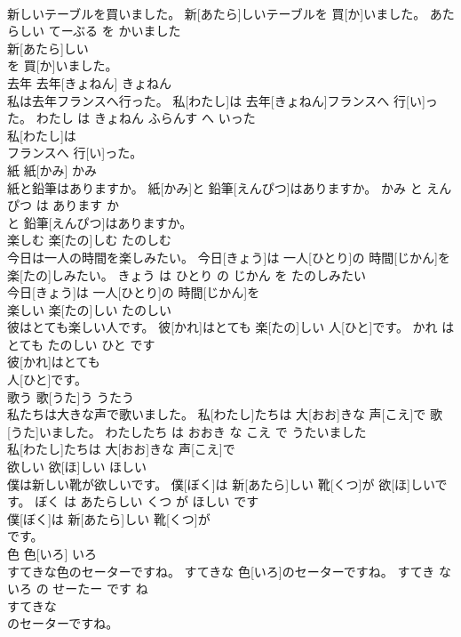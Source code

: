 \documentclass[8pt]{extreport}
\begin{document}
\begin{CJK}{UTF8}{min}
\\	新しいテーブルを買いました。	新[あたら]しいテーブルを 買[か]いました。	あたらしい てーぶる を かいました	
\\	新[あたら]しい
\\	を 買[か]いました。		
\\	去年	去年[きょねん]	きょねん	
\\	私は去年フランスへ行った。	私[わたし]は 去年[きょねん]フランスへ 行[い]った。	わたし は きょねん ふらんす へ いった	
\\	私[わたし]は
\\	フランスへ 行[い]った。		
\\	紙	紙[かみ]	かみ	
\\	紙と鉛筆はありますか。	紙[かみ]と 鉛筆[えんぴつ]はありますか。	かみ と えんぴつ は あります か	
\\	と 鉛筆[えんぴつ]はありますか。		
\\	楽しむ	楽[たの]しむ	たのしむ	
\\	今日は一人の時間を楽しみたい。	今日[きょう]は 一人[ひとり]の 時間[じかん]を 楽[たの]しみたい。	きょう は ひとり の じかん を たのしみたい	
\\	今日[きょう]は 一人[ひとり]の 時間[じかん]を
\\	楽しい	楽[たの]しい	たのしい	
\\	彼はとても楽しい人です。	彼[かれ]はとても 楽[たの]しい 人[ひと]です。	かれ は とても たのしい ひと です	
\\	彼[かれ]はとても
\\	人[ひと]です。		
\\	歌う	歌[うた]う	うたう	
\\	私たちは大きな声で歌いました。	私[わたし]たちは 大[おお]きな 声[こえ]で 歌[うた]いました。	わたしたち は おおき な こえ で うたいました	
\\	私[わたし]たちは 大[おお]きな 声[こえ]で
\\	欲しい	欲[ほ]しい	ほしい	
\\	僕は新しい靴が欲しいです。	僕[ぼく]は 新[あたら]しい 靴[くつ]が 欲[ほ]しいです。	ぼく は あたらしい くつ が ほしい です	
\\	僕[ぼく]は 新[あたら]しい 靴[くつ]が
\\	です。		
\\	色	色[いろ]	いろ	
\\	すてきな色のセーターですね。	すてきな 色[いろ]のセーターですね。	すてき な いろ の せーたー です ね	
\\	すてきな
\\	のセーターですね。		

\end{CJK}
\end{document}
